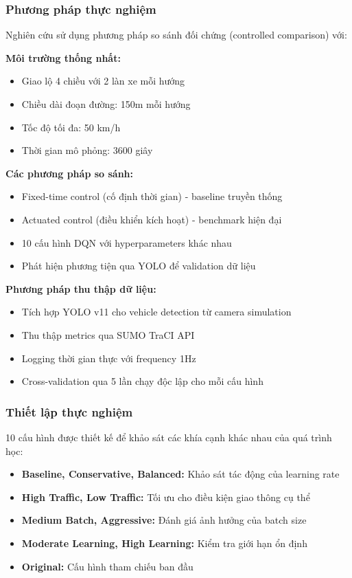 \subsubsection{Phương pháp thực nghiệm}
Nghiên cứu sử dụng phương pháp so sánh đối chứng (controlled comparison) với:

\textbf{Môi trường thống nhất:}
\begin{itemize}
    \item Giao lộ 4 chiều với 2 làn xe mỗi hướng
    \item Chiều dài đoạn đường: 150m mỗi hướng
    \item Tốc độ tối đa: 50 km/h
    \item Thời gian mô phỏng: 3600 giây
\end{itemize}

\textbf{Các phương pháp so sánh:}
\begin{itemize}
    \item Fixed-time control (cố định thời gian) - baseline truyền thống
    \item Actuated control (điều khiển kích hoạt) - benchmark hiện đại
    \item 10 cấu hình DQN với hyperparameters khác nhau
    \item Phát hiện phương tiện qua YOLO để validation dữ liệu
\end{itemize}

\textbf{Phương pháp thu thập dữ liệu:}
\begin{itemize}
    \item Tích hợp YOLO v11 cho vehicle detection từ camera simulation
    \item Thu thập metrics qua SUMO TraCI API
    \item Logging thời gian thực với frequency 1Hz
    \item Cross-validation qua 5 lần chạy độc lập cho mỗi cấu hình
\end{itemize}

\subsubsection{Thiết lập thực nghiệm}
10 cấu hình được thiết kế để khảo sát các khía cạnh khác nhau của quá trình học:
\begin{itemize}
    \item \textbf{Baseline, Conservative, Balanced:} Khảo sát tác động của learning rate
    \item \textbf{High Traffic, Low Traffic:} Tối ưu cho điều kiện giao thông cụ thể
    \item \textbf{Medium Batch, Aggressive:} Đánh giá ảnh hưởng của batch size
    \item \textbf{Moderate Learning, High Learning:} Kiểm tra giới hạn ổn định
    \item \textbf{Original:} Cấu hình tham chiếu ban đầu
\end{itemize}

